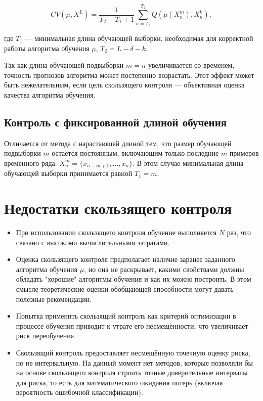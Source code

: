 \[
CV(\mu, X^L) = \frac{1}{T_2 - T_1 + 1} \sum_{n=T_1}^{T_2} Q \left(\mu(X^m_n), X^k_n\right),
\]

где \(T_1\) — минимальная длина обучающей выборки, необходимая для корректной работы алгоритма обучения \(\mu\), \(T_2 = L - \delta - k\).

Так как длина обучающей подвыборки \(m = n\) увеличивается со временем, точность прогнозов алгоритма может постепенно возрастать. Этот эффект может быть нежелательным, если цель скользящего контроля — объективная оценка качества алгоритма обучения.

\subsection{Контроль с фиксированной длиной обучения} Отличается от метода с нарастающей длиной тем, что размер обучающей подвыборки \(m\) остаётся постоянным, включающим только последние \(m\) примеров временного ряда: \( X^m_n = \{x_{n-m+1}, \ldots, x_n\} \). В этом случае минимальная длина обучающей выборки принимается равной \(T_1 = m\).


\section{Недостатки скользящего контроля}
\begin{itemize}
\item При использовании скользящего контроля обучение выполняется \( N \) раз, что связано с высокими вычислительными затратами. 
\item Оценка скользящего контроля предполагает наличие заранее заданного алгоритма обучения \( \mu \), но она не раскрывает, какими свойствами должны обладать "хорошие" алгоритмы обучения и как их можно построить. В этом смысле теоретические оценки обобщающей способности могут давать полезные рекомендации.

\item Попытка применить скользящий контроль как критерий оптимизации в процессе обучения приводит к утрате его несмещённости, что увеличивает риск переобучения. 
\item Скользящий контроль предоставляет несмещённую точечную оценку риска, но не интервальную. На данный момент нет методов, которые позволяли бы на основе скользящего контроля строить точные доверительные интервалы для риска, то есть для математического ожидания потерь (включая вероятность ошибочной классификации).
\end{itemize}

